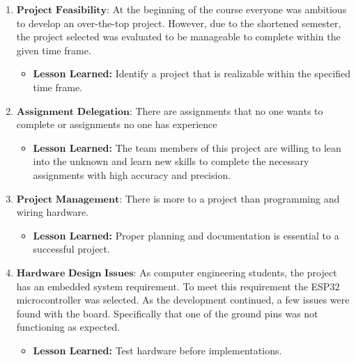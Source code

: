 \begin{enumerate}
    \item $\textbf{Project Feasibility:}$ At the beginning of the course everyone was ambitious to develop an over-the-top project. However, due to the shortened semester, the project selected was evaluated to be manageable to complete within the given time frame. 
        \begin{itemize}
            \item \textbf{Lesson Learned:} Identify a project that is realizable within the specified time frame. 
        \end{itemize}
    \item $\textbf{Assignment Delegation:}$ There are assignments that no one wants to complete or assignments no one has experience 
        \begin{itemize}
            \item \textbf{Lesson Learned:} The team members of this project are willing to lean into the unknown and learn new skills to complete the necessary assignments with high accuracy and precision. 
        \end{itemize}
    \item $\textbf{Project Management:}$ There is more to a project than programming and wiring hardware. 
        \begin{itemize}
            \item \textbf{Lesson Learned:} Proper planning and documentation is essential to a successful project. 
        \end{itemize}
    \item $\textbf{Hardware Design Issues:}$ As computer engineering students, the project has an embedded system requirement. To meet this requirement the ESP32 microcontroller was selected. As the development continued, a few issues were found with the board. Specifically that one of the ground pins was not functioning as expected.
        \begin{itemize}
            \item \textbf{Lesson Learned:} Test hardware before implementations. 
        \end{itemize}

\end{enumerate}